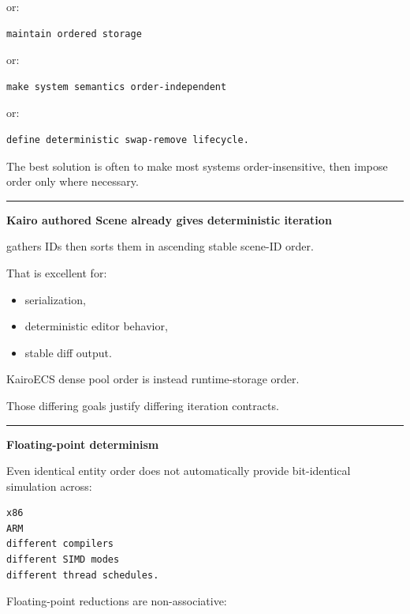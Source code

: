 or:

\begin{verbatim}
maintain ordered storage
\end{verbatim}

or:

\begin{verbatim}
make system semantics order-independent
\end{verbatim}

or:

\begin{verbatim}
define deterministic swap-remove lifecycle.
\end{verbatim}

The best solution is often to make most systems order-insensitive, then impose order only where necessary.

\begin{center}\rule{0.5\linewidth}{0.5pt}\end{center}

\textbf{Kairo authored Scene already gives deterministic iteration}

 gathers IDs then sorts them in ascending stable scene-ID order.

That is excellent for:

\begin{itemize}
\tightlist
\item
  serialization,
\item
  deterministic editor behavior,
\item
  stable diff output.
\end{itemize}

KairoECS dense pool order is instead runtime-storage order.

Those differing goals justify differing iteration contracts.

\begin{center}\rule{0.5\linewidth}{0.5pt}\end{center}

\textbf{Floating-point determinism}

Even identical entity order does not automatically provide bit-identical simulation across:

\begin{verbatim}
x86
ARM
different compilers
different SIMD modes
different thread schedules.
\end{verbatim}

Floating-point reductions are non-associative:

